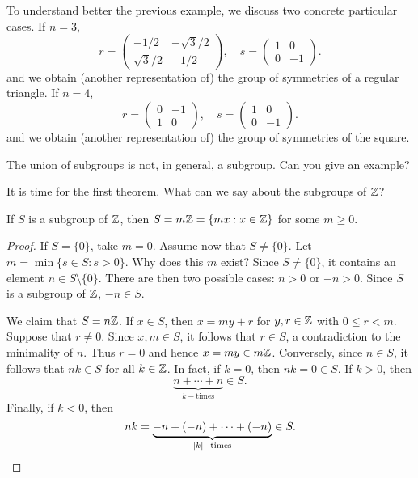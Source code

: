 To understand better the previous example, 
we discuss two concrete particular cases. 
If $n=3$, 
\[
r=\begin{pmatrix}
-1/2 & -\sqrt{3}/2\\
\sqrt{3}/2 & -1/2
\end{pmatrix},
\quad
s=\begin{pmatrix}
        1 & 0\\
        0 & -1
\end{pmatrix}.
\]
and we obtain (another representation of) the group of symmetries of a regular 
triangle. 
If 
$n=4$, 
\[
r=\begin{pmatrix}
0 & -1\\
1 & 0
\end{pmatrix},
\quad
s=\begin{pmatrix}
        1 & 0\\
        0 & -1
\end{pmatrix}.
\]
and we obtain (another representation of) the group of symmetries of the square. 

\begin{exercise}
        The union of subgroups is not, in general, 
        a subgroup. Can you give an example? 
\end{exercise}


It is time for the first theorem. 
What can we say about the subgroups of $\mathbb{Z}$? 

\begin{theorem}
        \label{thm:Z}
        If $S$ is a subgroup of $\mathbb{Z}$, then
                $S=m\mathbb{Z}=\{mx:x\in \mathbb{Z}\}$
                for some $m\geq0$.
        \end{theorem}
        
        \begin{proof}
                If $S=\{0\}$, take $m=0$. 
                Assume now that $S\ne\{0\}$. Let 
                $m=\min\{s\in S:s>0\}$. 
                Why does this $m$ exist?  
                Since $S\ne\{0\}$,  
                it contains 
                an element $n\in S\setminus\{0\}$. 
                There are then two possible cases: 
                $n>0$ or $-n>0$. Since 
                $S$ is a subgroup of $\mathbb{Z}$, $-n\in S$.
        
                We claim that $S=n\mathbb{Z}$.
                If $x\in S$, then $x=my+r$ for $y,r\in\mathbb{Z}$ with 
                $0\leq r<m$. Suppose that $r\ne 0$. Since $x,m\in S$, it follows that 
                $r\in S$,
                a contradiction to the minimality of $n$. Thus $r=0$ 
                and hence $x=my\in
                m\mathbb{Z}$. Conversely, since $n\in S$, it follows that
                 $nk\in S$ for all $k\in\mathbb{Z}$. In fact, if $k=0$, then 
                 $nk=0\in S$. If $k>0$, 
                 then 
                \[
                \underbrace{n+\cdots+n}_{k-\text{times}}\in S.
                \]
                Finally, if $k<0$, 
                then 
                \[
                nk=\underbrace{-n+(-n)+\cdots+(-n)}_{|k|-\text{times}}\in S.\qedhere
                \]
        \end{proof}

